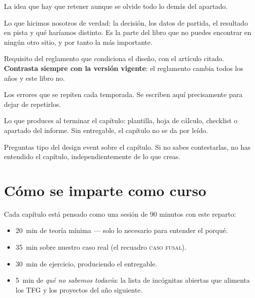 \begin{clave}
La idea que hay que retener aunque se olvide todo lo demás del apartado.
\end{clave}

\begin{caso}
Lo que hicimos nosotros de verdad: la decisión, los datos de partida, el
resultado en pista y qué haríamos distinto. Es la parte del libro que no puedes
encontrar en ningún otro sitio, y por tanto la más importante.
\end{caso}

\begin{regla}
Requisito del reglamento que condiciona el diseño, con el artículo citado.
\textbf{Contrasta siempre con la versión vigente}: el reglamento cambia todos
los años y este libro no.
\end{regla}

\begin{ojo}
Los errores que se repiten cada temporada. Se escriben aquí precisamente para
dejar de repetirlos.
\end{ojo}

\begin{entregable}
Lo que produces al terminar el capítulo: plantilla, hoja de cálculo, checklist o
apartado del informe. Sin entregable, el capítulo no se da por leído.
\end{entregable}

\begin{juez}
Preguntas tipo del design event sobre el capítulo. Si no sabes contestarlas, no
has entendido el capítulo, independientemente de lo que creas.
\end{juez}

\section*{Cómo se imparte como curso}

Cada capítulo está pensado como una sesión de 90 minutos con este reparto:

\begin{itemize}
  \item \SI{20}{\minute} de teoría mínima --- solo lo necesario para entender el porqué.
  \item \SI{35}{\minute} sobre nuestro caso real (el recuadro \textsc{caso fusal}).
  \item \SI{30}{\minute} de ejercicio, produciendo el entregable.
  \item \SI{5}{\minute} de \emph{qué no sabemos todavía}: la lista de incógnitas
        abiertas que alimenta los TFG y los proyectos del año siguiente.
\end{itemize}

